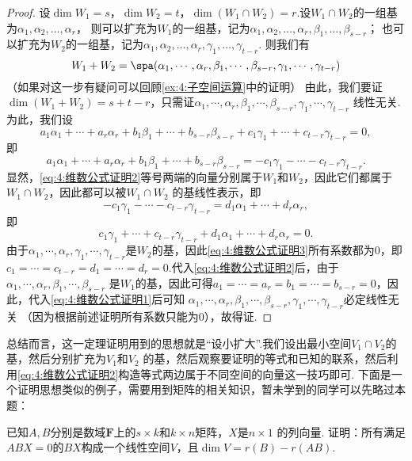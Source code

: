 \begin{proof}
    设$\dim W_1=s$，$\dim W_2=t$，$\dim(W_1\cap W_2)=r$.设$W_1\cap W_2$的一组基为$\alpha_1,\alpha_2,\ldots,\alpha_r$，
    则可以扩充为$W_1$的一组基，记为$\alpha_1,\alpha_2,\ldots,\alpha_r,\beta_1,\ldots,\beta_{s-r}$；
    也可以扩充为$W_2$的一组基，记为$\alpha_1,\alpha_2,\ldots,\alpha_r,\gamma_1,\ldots,\gamma_{t-r}$.
    则我们有
    \[W_1+W_2=\spa(\alpha_1,\cdots,\alpha_r,\beta_1,\cdots,\beta_{s-r},\gamma_1,\cdots,\gamma_{t-r})\]
    （如果对这一步有疑问可以回顾\autoref{ex:4:子空间运算}中的证明）
    由此，我们要证$\dim (W_1+W_2)=s+t-r$，只需证$\alpha_1,\cdots,\alpha_r,\beta_1,\cdots,\beta_{s-r},\gamma_1,\cdots,\gamma_{t-r}$
    线性无关.为此，我们设
    \begin{equation}\label{eq:4:维数公式证明1}
        a_1\alpha_1+\cdots+a_r\alpha_r+b_1\beta_1+\cdots+b_{s-r}\beta_{s-r}+c_1\gamma_1+\cdots+c_{t-r}\gamma_{t-r}=0,
    \end{equation}
    即
    \begin{equation}\label{eq:4:维数公式证明2}
        a_1\alpha_1+\cdots+a_r\alpha_r+b_1\beta_1+\cdots+b_{s-r}\beta_{s-r}=-c_1\gamma_1-\cdots-c_{t-r}\gamma_{t-r}.
    \end{equation}
    显然，\autoref{eq:4:维数公式证明2}等号两端的向量分别属于$W_1$和$W_2$，因此它们都属于$W_1\cap W_2$，因此都可以被$W_1\cap W_2$
    的基线性表示，即
    \[-c_1\gamma_1-\cdots-c_{t-r}\gamma_{t-r}=d_1\alpha_1+\cdots+d_r\alpha_r,\]
    即
    \begin{equation}\label{eq:4:维数公式证明3}
        c_1\gamma_1+\cdots+c_{t-r}\gamma_{t-r}+d_1\alpha_1+\cdots+d_r\alpha_r=0.
    \end{equation}
    由于$\alpha_1,\cdots,\alpha_r,\gamma_1,\cdots,\gamma_{t-r}$是$W_2$的基，因此\autoref{eq:4:维数公式证明3}所有系数都为0，即
    $c_1=\cdots=c_{t-r}=d_1=\cdots=d_r=0$.代入\autoref{eq:4:维数公式证明2}后，由于$\alpha_1,\cdots,\alpha_r,\beta_1,\cdots,\beta_{s-r}$
    是$W_1$的基，因此可得$a_1=\cdots=a_r=b_1=\cdots=b_{s-r}=0$，因此，代入\autoref{eq:4:维数公式证明1}后可知
    $\alpha_1,\cdots,\alpha_r,\beta_1,\cdots,\beta_{s-r},\gamma_1,\cdots,\gamma_{t-r}$必定线性无关
    （因为根据前述证明所有系数只能为0），故得证.
\end{proof}

总结而言，这一定理证明用到的思想就是``设小扩大''.我们设出最小空间$V_1\cap V_2$的基，然后分别扩充为$V_1$和$V_2$
的基，然后观察要证明的等式和已知的联系，然后利用\autoref{eq:4:维数公式证明2}构造等式两边属于不同空间的向量这一技巧即可.
下面是一个证明思想类似的例子，需要用到矩阵的相关知识，暂未学到的同学可以先略过本题：
\begin{example}
    已知$A,B$分别是数域$\mathbf{F}$上的$s \times k$和$k \times n$矩阵，$X$是$n \times 1$
    的列向量. 证明：所有满足$ABX=0$的$BX$构成一个线性空间$V$，且$\dim V = r(B) - r(AB)$.
\end{example}

